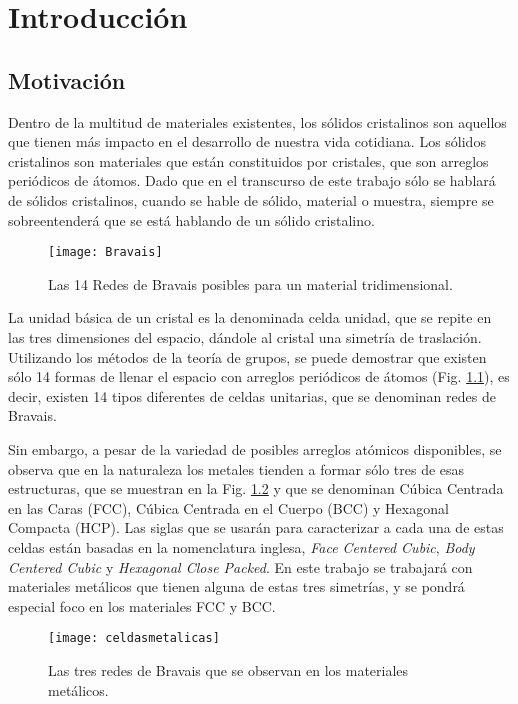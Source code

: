 \chapter{Introducción}
\graphicspath{{./figs/01_intro/}}
\section{Motivación}\label{S:motivacion}
Dentro de la multitud de materiales existentes, los sólidos cristalinos son aquellos que tienen más impacto en el desarrollo de nuestra vida cotidiana. 
Los sólidos cristalinos son materiales que están constituidos por cristales, que son arreglos periódicos de átomos. 
Dado que en el transcurso de este trabajo sólo se hablará de sólidos cristalinos, cuando se hable de sólido, material o muestra, siempre se sobreentenderá que se está hablando de un sólido cristalino.

\begin{figure}[h!]
  \centering
  \texttt{[image: Bravais]}
  \caption{Las 14 Redes de Bravais posibles para un material tridimensional.}
  \label{fig:Bravais}
\end{figure}

La unidad básica de un cristal es la denominada celda unidad, que se repite en las tres dimensiones del espacio, dándole al cristal una simetría de traslación. Utilizando los métodos de la teoría de grupos, se puede demostrar que existen sólo 14 formas de llenar el espacio con arreglos periódicos de átomos (Fig. \ref{fig:Bravais}), es decir, existen 14 tipos diferentes de celdas unitarias, que se denominan redes de Bravais\cite{hahn2005international}.

Sin embargo, a pesar de la variedad de posibles arreglos atómicos disponibles, se observa que en la naturaleza los metales tienden a formar sólo tres de esas estructuras, que se muestran en la Fig. \ref{fig:celdasmetalicas} y que se denominan Cúbica Centrada en las Caras (FCC), Cúbica Centrada en el Cuerpo (BCC) y Hexagonal Compacta (HCP). 
Las siglas que se usarán para caracterizar a cada una de estas celdas están basadas en la nomenclatura inglesa, \textit{Face Centered Cubic}, \textit{Body Centered Cubic} y \textit{Hexagonal Close Packed}. En este trabajo se trabajará con materiales metálicos que tienen alguna de estas tres simetrías, y se pondrá especial foco en los materiales FCC y BCC.

\begin{figure}[h!]
  \centering
  \texttt{[image: celdasmetalicas]}
  \caption{Las tres redes de Bravais que se observan en los materiales metálicos.}
  \label{fig:celdasmetalicas}
\end{figure} 

